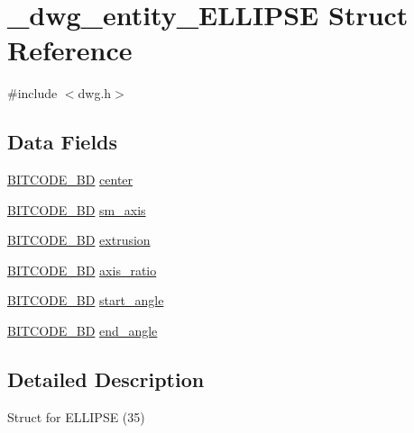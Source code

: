 \hypertarget{struct__dwg__entity__ELLIPSE}{\section{\-\_\-dwg\-\_\-entity\-\_\-\-E\-L\-L\-I\-P\-S\-E \-Struct \-Reference}
\label{struct__dwg__entity__ELLIPSE}
}


{\ttfamily \#include $<$dwg.\-h$>$}

\subsection*{\-Data \-Fields}
\begin{DoxyCompactItemize}
\item 
\hyperlink{dwg_8h_a00698ef1bb072aa0a9360c6fc1c57587}{\-B\-I\-T\-C\-O\-D\-E\-\_\-B\-D} \hyperlink{struct__dwg__entity__ELLIPSE_a5a0a154991ee58359d86c9eaabc0d97c}{center}
\item 
\hyperlink{dwg_8h_a00698ef1bb072aa0a9360c6fc1c57587}{\-B\-I\-T\-C\-O\-D\-E\-\_\-B\-D} \hyperlink{struct__dwg__entity__ELLIPSE_a64698ec29610897e229ab08339097b3a}{sm\-\_\-axis}
\item 
\hyperlink{dwg_8h_a00698ef1bb072aa0a9360c6fc1c57587}{\-B\-I\-T\-C\-O\-D\-E\-\_\-B\-D} \hyperlink{struct__dwg__entity__ELLIPSE_a1ad9beac6c2cbbf70fff8bddd686c548}{extrusion}
\item 
\hyperlink{dwg_8h_a3c1e6781466b74ba07785d57da70ed97}{\-B\-I\-T\-C\-O\-D\-E\-\_\-\-B\-D} \hyperlink{struct__dwg__entity__ELLIPSE_a107d6db46ea0443c78e1bae65a06c555}{axis\-\_\-ratio}
\item 
\hyperlink{dwg_8h_a3c1e6781466b74ba07785d57da70ed97}{\-B\-I\-T\-C\-O\-D\-E\-\_\-\-B\-D} \hyperlink{struct__dwg__entity__ELLIPSE_a600d765d6de9feb5eadcbbccb313d699}{start\-\_\-angle}
\item 
\hyperlink{dwg_8h_a3c1e6781466b74ba07785d57da70ed97}{\-B\-I\-T\-C\-O\-D\-E\-\_\-\-B\-D} \hyperlink{struct__dwg__entity__ELLIPSE_ac5a3439e8ea502ed5bd0b94e9e8e24ab}{end\-\_\-angle}
\end{DoxyCompactItemize}


\subsection{\-Detailed \-Description}
\-Struct for \-E\-L\-L\-I\-P\-S\-E (35) 


